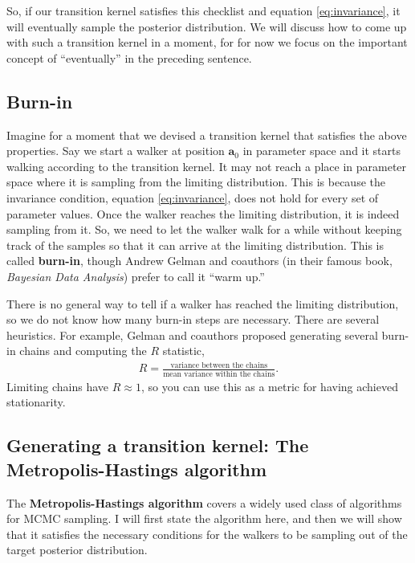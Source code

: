 So, if our transition kernel satisfies this checklist and equation
\eqref{eq:invariance}, it will eventually sample the posterior
distribution.  We will discuss how to come up with such a transition
kernel in a moment, for for now we focus on the important concept of
``eventually'' in the preceding sentence.

\subsection{Burn-in}
Imagine for a moment that we devised a transition kernel that
satisfies the above properties.  Say we start a walker at position
$\mathbf{a}_0$ in parameter space and it starts walking according to
the transition kernel.  It may not reach a place in parameter space
where it is sampling from the limiting distribution.  This is because
the invariance condition, equation \eqref{eq:invariance}, does not
hold for every set of parameter values.  Once the walker reaches the
limiting distribution, it is indeed sampling from it.  So, we need to
let the walker walk for a while without keeping track of the samples
so that it can arrive at the limiting distribution.  This is called
\textbf{burn-in}, though Andrew Gelman and coauthors (in their famous book, \textit{Bayesian Data Analysis}) prefer to call it ``warm up.''

There is no general way to tell if a walker has reached the limiting
distribution, so we do not know how many burn-in steps are necessary.
There are several heuristics.  For example, Gelman and
coauthors proposed generating several burn-in chains and computing the $R$
statistic,
\begin{align}
R = \frac{\text{variance between the chains}}{\text{mean variance within the chains}}.
\end{align}
Limiting chains have $R \approx 1$, so you can use this as a metric
for having achieved stationarity.


\subsection{Generating a transition kernel: The Metropolis-Hastings algorithm}
The \textbf{Metropolis-Hastings algorithm} covers a widely used class
of algorithms for MCMC sampling.  I will first state the algorithm
here, and then we will show that it satisfies the necessary conditions
for the walkers to be sampling out of the target posterior
distribution.

